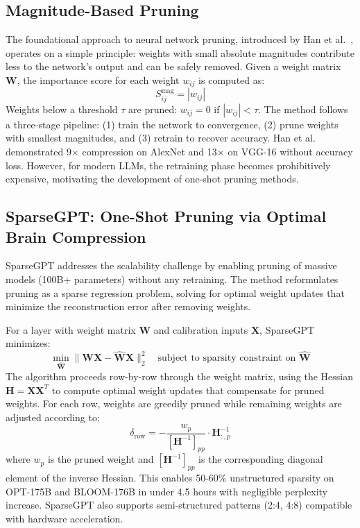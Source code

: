 \documentclass{article}
\begin{document}
\subsection{Magnitude-Based Pruning}

The foundational approach to neural network pruning, introduced by Han et al.~\cite{han2015learning}, operates on a simple principle: weights with small absolute magnitudes contribute less to the network's output and can be safely removed. Given a weight matrix $\mathbf{W}$, the importance score for each weight $w_{ij}$ is computed as:
\begin{equation}
    S_{ij}^{\text{mag}} = |w_{ij}|
\end{equation}
Weights below a threshold $\tau$ are pruned: $w_{ij} = 0$ if $|w_{ij}| < \tau$. The method follows a three-stage pipeline: (1) train the network to convergence, (2) prune weights with smallest magnitudes, and (3) retrain to recover accuracy. Han et al. demonstrated 9$\times$ compression on AlexNet and 13$\times$ on VGG-16 without accuracy loss. However, for modern LLMs, the retraining phase becomes prohibitively expensive, motivating the development of one-shot pruning methods.

\subsection{SparseGPT: One-Shot Pruning via Optimal Brain Compression}

SparseGPT \cite{frantar2023sparsegpt} addresses the scalability challenge by enabling pruning of massive models (100B+ parameters) without any retraining. The method reformulates pruning as a sparse regression problem, solving for optimal weight updates that minimize the reconstruction error after removing weights.

For a layer with weight matrix $\mathbf{W}$ and calibration inputs $\mathbf{X}$, SparseGPT minimizes:
\begin{equation}
    \min_{\hat{\mathbf{W}}} \|\mathbf{W}\mathbf{X} - \hat{\mathbf{W}}\mathbf{X}\|_2^2 \quad \text{subject to sparsity constraint on } \hat{\mathbf{W}}
\end{equation}
The algorithm proceeds row-by-row through the weight matrix, using the Hessian $\mathbf{H} = \mathbf{X}\mathbf{X}^T$ to compute optimal weight updates that compensate for pruned weights. For each row, weights are greedily pruned while remaining weights are adjusted according to:
\begin{equation}
    \delta_{\text{row}} = -\frac{w_p}{[\mathbf{H}^{-1}]_{pp}} \cdot \mathbf{H}^{-1}_{:,p}
\end{equation}
where $w_p$ is the pruned weight and $[\mathbf{H}^{-1}]_{pp}$ is the corresponding diagonal element of the inverse Hessian. This enables 50-60\% unstructured sparsity on OPT-175B and BLOOM-176B in under 4.5 hours with negligible perplexity increase. SparseGPT also supports semi-structured patterns (2:4, 4:8) compatible with hardware acceleration.
\end{document}
